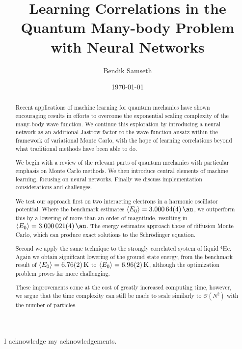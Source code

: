 \documentclass[twoside,english]{uiofysmaster}
\author{Bendik Samseth}
\title{Learning Correlations in the Quantum Many-body Problem with Neural Networks}
\date{\monthyeardate\today}
\begin{document}
\maketitle

\begin{abstract}
Recent applications of machine learning for quantum mechanics have shown
encouraging results in efforts to overcome the exponential scaling complexity of
the many-body wave function. We continue this exploration by introducing a
neural network as an additional Jastrow factor to the wave function ansatz
within the framework of variational Monte Carlo, with the hope of learning
correlations beyond what traditional methods have been able to do.

We begin with a review of the relevant parts of quantum mechanics with particular
emphasis on Monte Carlo methods. We then introduce central elements of machine
learning, focusing on neural networks. Finally we discuss implementation
considerations and challenges.

We test our approach first on two interacting electrons in a harmonic oscillator
potential. Where the benchmark estimates $\expval{E_0}=\SI{3.00064(4)}{\au}$, we
outperform this by a lowering of more than an order of magnitude, resulting in
$\expval{E_0}=\SI{3.000021(4)}{\au}$. The energy estimates approach those of
diffusion Monte Carlo, which can produce exact solutions to the Schrödinger equation.

Second we apply the same technique to the strongly correlated system of liquid
$^4$He. Again we obtain significant lowering of the ground state energy, from
the benchmark result of $\expval{E_0}=\SI{6.76(2)}{\kelvin}$ to
$\expval{E_0}=\SI{6.96(2)}{\kelvin}$, although the optimization problem proves far
more challenging.

These improvements come at the cost of greatly increased computing time,
however, we argue that the time complexity can still be made to scale similarly to
$\mathcal{O}(N^2)$ with the number of particles.
\end{abstract}



\begin{acknowledgements}
  I acknowledge my acknowledgements.
\end{acknowledgements}

\tableofcontents

\listoffigures
\begingroup
\let\clearpage\relax
\listoftables
\endgroup


\end{document}
